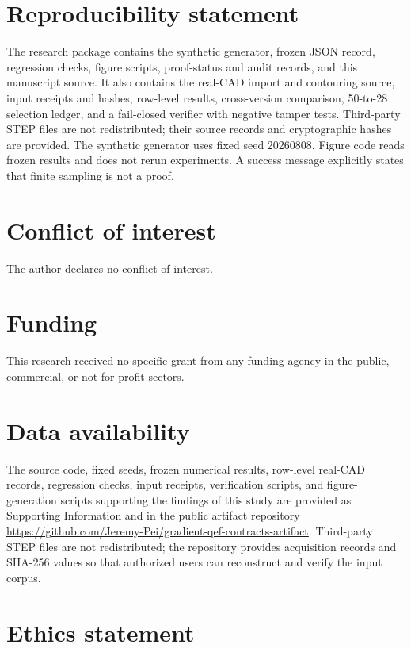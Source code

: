 \documentclass[11pt]{article}
\theoremstyle{definition}
\begin{document}
\section*{Reproducibility statement}

The research package contains the synthetic generator, frozen JSON record,
regression checks, figure scripts, proof-status and audit records, and this
manuscript source.  It also contains the real-CAD import and contouring source,
input receipts and hashes, row-level results, cross-version comparison,
50-to-28 selection ledger, and a fail-closed verifier with negative tamper
tests.  Third-party STEP files are not redistributed; their source records and
cryptographic hashes are provided.  The synthetic generator uses fixed seed
20260808.  Figure code reads frozen results and does not rerun experiments.  A
success message explicitly states that finite sampling is not a proof.

\section*{Conflict of interest}

The author declares no conflict of interest.

\section*{Funding}

This research received no specific grant from any funding agency in the public,
commercial, or not-for-profit sectors.

\section*{Data availability}

The source code, fixed seeds, frozen numerical results, row-level real-CAD
records, regression checks, input receipts, verification scripts, and
figure-generation scripts supporting the findings of this study are provided
as Supporting Information and in the public artifact repository
\url{https://github.com/Jeremy-Pei/gradient-qef-contracts-artifact}.  Third-party
STEP files are not redistributed; the repository provides acquisition records
and SHA-256 values so that authorized users can reconstruct and verify the
input corpus.

\section*{Ethics statement}
\end{document}
